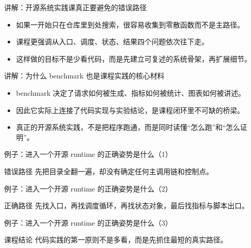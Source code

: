 \begin{frame}{讲解：开源系统实践课真正要避免的错误路径}
  \begin{itemize}
    \item 如果一开始只在仓库里到处搜索，很容易收集到零散函数而不是主路径。
    \item 课程更强调从入口、调度、状态、结果四个问题依次往下走。
    \item 这样做的目标不是少看代码，而是先建立可复述的系统骨架，再扩展细节。
  \end{itemize}
\end{frame}

\begin{frame}{讲解：为什么 benchmark 也是课程实践的核心材料}
  \begin{itemize}
    \item benchmark 决定了请求如何被生成、指标如何被统计、图表如何被讲述。
    \item 因此它实际上连接了代码实现与实验结论，是课程闭环里不可缺的桥梁。
    \item 真正的开源系统实践，不是把程序跑通，而是同时读懂“怎么跑”和“怎么证明”。
  \end{itemize}
\end{frame}

\begin{frame}{例子：进入一个开源 runtime 的正确姿势是什么（1）}
\begin{block}{错误路径}
    先把目录全翻一遍，却没有确定任何主调用链和控制点。
  \end{block}
\end{frame}

\begin{frame}{例子：进入一个开源 runtime 的正确姿势是什么（2）}
\begin{block}{正确路径}
    先找入口，再找调度循环，再找状态对象，最后找指标与脚本出口。
  \end{block}
\end{frame}

\begin{frame}{例子：进入一个开源 runtime 的正确姿势是什么（3）}
\begin{block}{课程结论}
    代码实践的第一原则不是多看，而是先抓住最短的真实路径。
  \end{block}
\end{frame}

